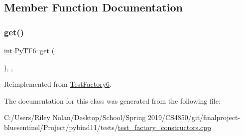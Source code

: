 \subsection{Member Function Documentation}
\mbox{\label{class_py_t_f6_ae98e91c8c1c7533878f3970158b9b0b7}} 
\subsubsection{\texorpdfstring{get()}{get()}}
{\footnotesize\ttfamily \mbox{\hyperlink{warnings_8h_a74f207b5aa4ba51c3a2ad59b219a423b}{int}} Py\+T\+F6\+::get (\begin{DoxyParamCaption}{ }\end{DoxyParamCaption})\hspace{0.3cm}{\ttfamily [inline]}, {\ttfamily [override]}, {\ttfamily [virtual]}}



Reimplemented from \mbox{\hyperlink{class_test_factory6_a2b86e7fb37163118f7833a1acf4f2a66}{Test\+Factory6}}.



The documentation for this class was generated from the following file\+:\begin{DoxyCompactItemize}
\item 
C\+:/\+Users/\+Riley Nolan/\+Desktop/\+School/\+Spring 2019/\+C\+S4850/git/finalproject-\/bluesentinel/\+Project/pybind11/tests/\mbox{\hyperlink{test__factory__constructors_8cpp}{test\+\_\+factory\+\_\+constructors.\+cpp}}\end{DoxyCompactItemize}
